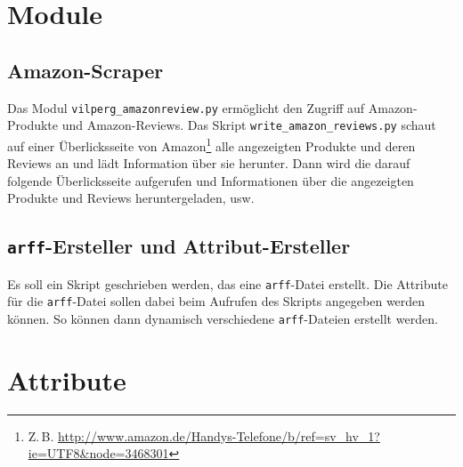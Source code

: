 \documentclass[a4paper]{article}
\newcommand{\ourfile}[1]{\texttt{#1}}
\newcommand{\ourextension}[1]{\texttt{#1}}
\begin{document}

\section{Module}


\subsection{Amazon-Scraper}
\label{scraper}
Das Modul \ourfile{vilperg\_amazonreview.py} ermöglicht den Zugriff auf Amazon-Produkte und Amazon-Reviews.
Das Skript \ourfile{write\_amazon\_reviews.py} schaut auf einer Überlicksseite von Amazon\footnote{Z.\,B. \url{http://www.amazon.de/Handys-Telefone/b/ref=sv_hv_1?ie=UTF8&node=3468301}} alle angezeigten Produkte und deren Reviews an und lädt Information über sie herunter.
Dann wird die darauf folgende Überlicksseite aufgerufen und Informationen über die angezeigten Produkte und Reviews heruntergeladen, usw.


\subsection{\ourextension{arff}-Ersteller und Attribut-Ersteller}
\label{make_arff}
Es soll ein Skript geschrieben werden, das eine \ourextension{arff}-Datei erstellt.
Die Attribute für die \ourextension{arff}-Datei sollen dabei beim Aufrufen des Skripts angegeben werden können.
So können dann dynamisch verschiedene \ourextension{arff}-Dateien erstellt werden.


\section{Attribute}

\end{document}

